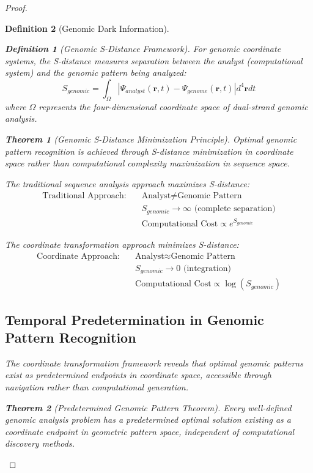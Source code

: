\documentclass[12pt,a4paper]{article}
\newtheorem{theorem}{Theorem}
\newtheorem{definition}{Definition}
\begin{document}
\begin{proof}
\begin{definition}[Genomic Dark Information]
\begin{definition}[Genomic S-Distance Framework]
For genomic coordinate systems, the S-distance measures separation between the analyst (computational system) and the genomic pattern being analyzed:
\begin{equation}
S_{genomic} = \int_{\Omega} |\Psi_{analyst}(\mathbf{r}, t) - \Psi_{genome}(\mathbf{r}, t)| d^4\mathbf{r} dt
\end{equation}
where $\Omega$ represents the four-dimensional coordinate space of dual-strand genomic analysis.
\end{definition}

\begin{theorem}[Genomic S-Distance Minimization Principle]
Optimal genomic pattern recognition is achieved through S-distance minimization in coordinate space rather than computational complexity maximization in sequence space.
\end{theorem}

The traditional sequence analysis approach maximizes S-distance:
\begin{align}
\text{Traditional Approach:} \quad &\text{Analyst} \neq \text{Genomic Pattern} \\
&S_{genomic} \rightarrow \infty \text{ (complete separation)} \\
&\text{Computational Cost} \propto e^{S_{genomic}}
\end{align}

The coordinate transformation approach minimizes S-distance:
\begin{align}
\text{Coordinate Approach:} \quad &\text{Analyst} \approx \text{Genomic Pattern} \\
&S_{genomic} \rightarrow 0 \text{ (integration)} \\
&\text{Computational Cost} \propto \log(S_{genomic})
\end{align}

\subsection{Temporal Predetermination in Genomic Pattern Recognition}

The coordinate transformation framework reveals that optimal genomic patterns exist as predetermined endpoints in coordinate space, accessible through navigation rather than computational generation.

\begin{theorem}[Predetermined Genomic Pattern Theorem]
Every well-defined genomic analysis problem has a predetermined optimal solution existing as a coordinate endpoint in geometric pattern space, independent of computational discovery methods.
\end{theorem}


\end{definition}
\end{proof}
\end{document}
